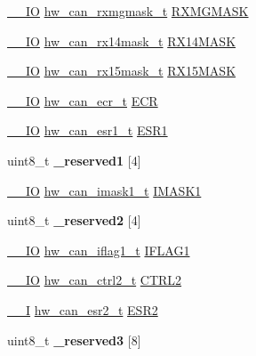 \begin{DoxyCompactItemize}
\item 
\hyperlink{core__sc300_8h_aec43007d9998a0a0e01faede4133d6be}{\+\_\+\+\_\+\+IO} \hyperlink{union__hw__can__rxmgmask}{hw\+\_\+can\+\_\+rxmgmask\+\_\+t} \hyperlink{struct__hw__can_a0863d976207724fce26cf8b2dfdcc652}{R\+X\+M\+G\+M\+A\+SK}
\item 
\hyperlink{core__sc300_8h_aec43007d9998a0a0e01faede4133d6be}{\+\_\+\+\_\+\+IO} \hyperlink{union__hw__can__rx14mask}{hw\+\_\+can\+\_\+rx14mask\+\_\+t} \hyperlink{struct__hw__can_a9be3a3a467663dc359125148354404f1}{R\+X14\+M\+A\+SK}
\item 
\hyperlink{core__sc300_8h_aec43007d9998a0a0e01faede4133d6be}{\+\_\+\+\_\+\+IO} \hyperlink{union__hw__can__rx15mask}{hw\+\_\+can\+\_\+rx15mask\+\_\+t} \hyperlink{struct__hw__can_a9c157ca25aa15a09c73fd71084f92308}{R\+X15\+M\+A\+SK}
\item 
\hyperlink{core__sc300_8h_aec43007d9998a0a0e01faede4133d6be}{\+\_\+\+\_\+\+IO} \hyperlink{union__hw__can__ecr}{hw\+\_\+can\+\_\+ecr\+\_\+t} \hyperlink{struct__hw__can_ae5b1470485d8001633bcdaa2cf101954}{E\+CR}
\item 
\hyperlink{core__sc300_8h_aec43007d9998a0a0e01faede4133d6be}{\+\_\+\+\_\+\+IO} \hyperlink{union__hw__can__esr1}{hw\+\_\+can\+\_\+esr1\+\_\+t} \hyperlink{struct__hw__can_a15bc587611b8fd680a7aa9f0585fb47c}{E\+S\+R1}
\item 
uint8\+\_\+t {\bfseries \+\_\+reserved1} \mbox{[}4\mbox{]}\hypertarget{struct__hw__can_ada0111f19c24834afc5d4ad642d4c471}{}\label{struct__hw__can_ada0111f19c24834afc5d4ad642d4c471}

\item 
\hyperlink{core__sc300_8h_aec43007d9998a0a0e01faede4133d6be}{\+\_\+\+\_\+\+IO} \hyperlink{union__hw__can__imask1}{hw\+\_\+can\+\_\+imask1\+\_\+t} \hyperlink{struct__hw__can_a82c7182b4e5273fd311cb72644d9ac94}{I\+M\+A\+S\+K1}
\item 
uint8\+\_\+t {\bfseries \+\_\+reserved2} \mbox{[}4\mbox{]}\hypertarget{struct__hw__can_a765f6016a4285c085855214e2158b66e}{}\label{struct__hw__can_a765f6016a4285c085855214e2158b66e}

\item 
\hyperlink{core__sc300_8h_aec43007d9998a0a0e01faede4133d6be}{\+\_\+\+\_\+\+IO} \hyperlink{union__hw__can__iflag1}{hw\+\_\+can\+\_\+iflag1\+\_\+t} \hyperlink{struct__hw__can_a5c43e6bb2474470e62f8a831eca221a1}{I\+F\+L\+A\+G1}
\item 
\hyperlink{core__sc300_8h_aec43007d9998a0a0e01faede4133d6be}{\+\_\+\+\_\+\+IO} \hyperlink{union__hw__can__ctrl2}{hw\+\_\+can\+\_\+ctrl2\+\_\+t} \hyperlink{struct__hw__can_a75afb62975bf4676b4a96e33ba3c5482}{C\+T\+R\+L2}
\item 
\hyperlink{core__sc300_8h_af63697ed9952cc71e1225efe205f6cd3}{\+\_\+\+\_\+I} \hyperlink{union__hw__can__esr2}{hw\+\_\+can\+\_\+esr2\+\_\+t} \hyperlink{struct__hw__can_ad525cd05794b16e66980db00bf7f5c19}{E\+S\+R2}
\item 
uint8\+\_\+t {\bfseries \+\_\+reserved3} \mbox{[}8\mbox{]}\hypertarget{struct__hw__can_a52ead78784bda79463a9757aa32043e6}{}\label{struct__hw__can_a52ead78784bda79463a9757aa32043e6}


\end{DoxyCompactItemize}
